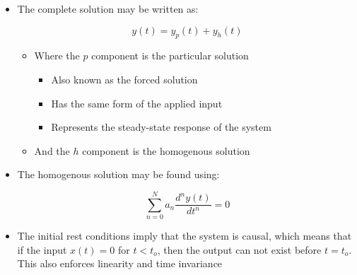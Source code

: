 \begin{itemize}
  \item The complete solution may be written as:

    $$y(t)=y_p(t)+y_h(t)$$

    \begin{itemize}

      \item Where the $p$ component is the particular solution

        \begin{itemize}

          \item Also known as the forced solution

          \item Has the same form of the applied input

          \item Represents the steady-state response of the system

        \end{itemize}

      \item And the $h$ component is the homogenous solution

    \end{itemize}

  \item The homogenous solution may be found using:

    $$\sum_{n=0}^Na_n\frac{d^ny(t)}{dt^n}=0$$

  \item The initial rest conditions imply that the system is causal, which means that if the input $x(t)=0$ for $t<t_o$, then the output can not exist before $t=t_o$. This also enforces linearity and time invariance

\end{itemize}



